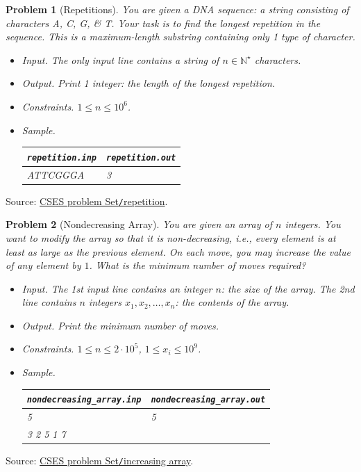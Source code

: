 \documentclass{article}
\newtheorem{problem}{Problem}
\begin{document}
\begin{problem}[Repetitions]
	You are given a DNA sequence: a string consisting of characters A, C, G, \& T. Your task is to find the longest repetition in the sequence. This is a maximum-length substring containing only 1 type of character.
	\begin{itemize}
		\item {\sf Input.} The only input line contains a string of $n\in\mathbb{N}^\star$ characters.
		\item {\sf Output.} Print 1 integer: the length of the longest repetition.
		\item {\sf Constraints.} $1\le n\le10^6$.
		\item {\sf Sample.}
		\begin{table}[H]
			\centering
			\begin{tabular}{|l|l|}
				\hline
				\verb|repetition.inp| & \verb|repetition.out| \\
				\hline
				ATTCGGGA & 3 \\
				\hline
			\end{tabular}
		\end{table}
	\end{itemize}	
\end{problem}
Source: \href{https://cses.fi/problemset/task/1069}{CSES problem Set{\tt/}repetition}.

\begin{problem}[Nondecreasing Array]
	You are given an array of $n$ integers. You want to modify the array so that it is non-decreasing, i.e., every element is at least as large as the previous element. On each move, you may increase the value of any element by $1$. What is the minimum number of moves required?
	\begin{itemize}
		\item {\sf Input.} The 1st input line contains an integer $n$: the size of the array. The 2nd line contains $n$ integers $x_1,x_2,\ldots,x_n$: the contents of the array.
		\item {\sf Output.} Print the minimum number of moves.
		\item {\sf Constraints.} $1\le n\le2\cdot10^5$, $1\le x_i\le10^9$.
		\item {\sf Sample.}
		\begin{table}[H]
			\centering
			\begin{tabular}{|l|l|}
				\hline
				\verb|nondecreasing_array.inp| & \verb|nondecreasing_array.out| \\
				\hline
				5 & 5 \\
				3 2 5 1 7 & \\
				\hline
			\end{tabular}
		\end{table}
	\end{itemize}
\end{problem}
Source: \href{https://cses.fi/problemset/task/1094}{CSES problem Set{\tt/}increasing array}.
\end{document}
